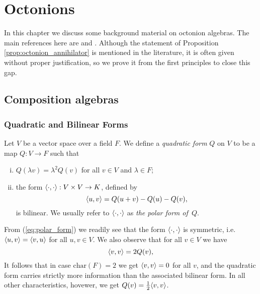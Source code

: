 
\chapter{Octonions}
\ifpdf
    \graphicspath{{Chapter1/Chapter1Figs/PNG/}{Chapter1/Chapter1Figs/PDF/}{Chapter1/Chapter1Figs/}}
\else
    \graphicspath{{Chapter1/Chapter1Figs/EPS/}{Chapter1/Chapter1Figs/}}
\fi

\label{chapter1}


In this chapter we discuss some background 
material on octonion algebras. The main 
references here are \cite{SpringerVeldkamp}
and \cite{Schafer}. Although the statement
of Proposition \ref{prop:octonion_annihilator}
is mentioned in the literature, it is often
given without proper justification, so we
prove it from the first principles to close 
this gap.


\section{Composition algebras}

\subsection{Quadratic and Bilinear Forms}

Let $V$ be a vector space over a field $F$. We define a \textit{quadratic form}
$Q$ on $V$ to be a map $Q : V \rightarrow F$ such that
\begin{enumerate}[(i)]
\item $Q(\lambda v) = \lambda^2 Q(v)$ for all $v \in V$ and
  $\lambda \in F$;

\item the form $\langle \cdot, \cdot \rangle: V\times V \rightarrow K$,
  defined by
  \begin{equation}
  	\label{eq:polar_form}
    \langle u, v \rangle = Q(u+v) - Q(u) - Q(v),
  \end{equation}
  is bilinear. We usually refer to $\langle \cdot, \cdot \rangle$ as 
  \textit{the polar form of\ $Q$}. 
\end{enumerate}
From (\ref{eq:polar_form}) we readily see that the form $\langle \cdot, \cdot \rangle$ is symmetric,
i.e. $\langle u, v \rangle = \langle v, u \rangle$ for all $u,v \in V$. We also observe that for all 
$v \in V$ we have
\begin{equation}
	\langle v, v \rangle = 2Q(v),
\end{equation}
It follows that in case $\mathrm{char}(F) = 2$ we get $\langle v, v \rangle = 0$ for all $v$, and 
the quadratic form
carries strictly more information than the associated bilinear form. In all other characteristics,
hovewer, we get $Q(v) = \frac12 \langle v, v \rangle$. 


